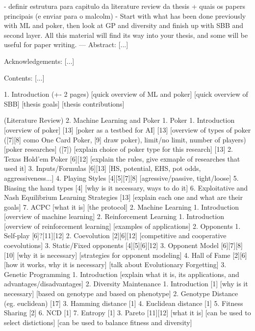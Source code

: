 - definir estrutura para capitulo da literature review da thesis + quais os papers principais (e enviar para o malcolm)
    - Start with what has been done previously with ML and poker, then look at GP and diversity and finish up with SBB and second layer. All this material will find its way into your thesis, and some will be useful for paper writing.
---
Abstract:
[...]

Acknowledgements:
[...]

Contents:
[...]

1. Introduction (+- 2 pages)
    [quick overview of ML and poker]
    [quick overview of SBB]
    [thesis goals]
    [thesis contributions]

(Literature Review)
2. Machine Learning and Poker
    1. Poker
        1. Introduction
            [overview of poker] [13]
            [poker as a testbed for AI] [13]
            [overview of types of poker ([7][8] como One Card Poker, [9] draw poker), limit/no limit, number of players)
            [poker researches] ([7])
            [explain choice of poker type for this research] [13]
        2. Texas Hold’em Poker [6][12]
            [explain the rules, give exmaple of researches that used it]
        3. Inputs/Formulas [6][13]
            [HS, potential, EHS, pot odds, aggressiveness...]
        4. Playing Styles [4][5][7][8]
            [agressive/passive, tight/loose]
        5. Biasing the hand types [4]
            [why is it necessary, ways to do it]
        6. Exploitative and Nash Equilibrium Learning Strategies [13]
            [explain each one and what are their goals]
        7. ACPC
            [what it is]
            [the protocol]
    2. Machine Learning
        1. Introduction
            [overview of machine learning]
        2. Reinforcement Learning
            1. Introduction
                [overview of reinforcement learning]
                [examples of applications]
            2. Opponents
                1. Self-play [6]?[11][12]
                2. Coevolution [2][6][12]
                    [competitive and cooperative coevolutions]
                3. Static/Fixed opponents [4][5][6][12]
            3. Opponent Model [6][7][8][10]
                [why it is necessary]
                [strategies for opponent modeling]
            4. Hall of Fame [2][6]
                [how it works, why it is necessary]
                [talk about Evolutionary Forgetting]
        3. Genetic Programming
            1. Introduction
                [explain what it is, its applications, and advantages/disadvantages]
            2. Diversity Maintenance
                1. Introduction [1]
                    [why is it necessary]
                    [based on genotype and based on phenotype]
                2. Genotype Distance (eg. euclidean) [17]
                3. Hamming distance [1]
                4. Euclidean distance [1]
                5. Fitness Sharing [2]
                6. NCD [1]
                7. Entropy [1]
            3. Pareto [11][12]
                [what it is]
                [can be used to select distictions]
                [can be used to balance fitness and diversity]

